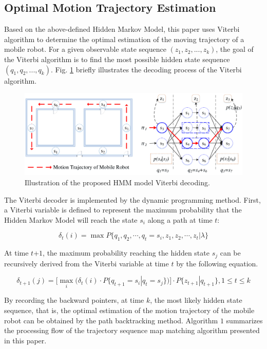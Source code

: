 \documentclass{llncs}
\begin{document}
\subsection{Optimal Motion Trajectory Estimation}

Based on the above-defined Hidden Markov Model, this paper uses Viterbi algorithm to determine the optimal estimation of the moving trajectory of a mobile robot. For a given observable state sequence $({z_1},{z_2},...,{z_k})$, the goal of the Viterbi algorithm is to find the most possible hidden state sequence $({q_1},{q_2},...,{q_k})$. Fig. \ref{fig-viterbi} briefly illustrates the decoding process of the Viterbi algorithm.

\begin{figure}[!htbp]
	\centering
	\includegraphics[width=4.976in]{RobotMatch-ViterbiDecoding}
	\caption{Illustration of the proposed HMM model Viterbi decoding.}
	\label{fig-viterbi}
\end{figure}

The Viterbi decoder is implemented by the dynamic programming method. First, a Viterbi variable is defined to represent the maximum probability that the Hidden Markov Model will reach the state $s_i$ along a path at time $t$:

\begin{equation}
	{\delta _t}(i) = \max P\{ {q_1},{q_2}, \cdots ,{q_t} = {s_i},{z_1},{z_2}, \cdots ,{z_t}|\lambda \}
\end{equation}

At time $t$+$1$, the maximum probability reaching the hidden state $s_j$ can be recursively derived from the Viterbi variable at time $t$ by the following equation. 

\begin{equation}
	{\delta _{t + 1}}(j) = [\mathop {\max }\limits_i ({\delta _t}(i) \cdot P\{ {q_{t + 1}} = {s_i}|{q_t} = {s_j}\} )] \cdot P\{ {z_{t + 1}}|{q_{t + 1}}\} ,1 \le t \le k
\end{equation}

By recording the backward pointers, at time $k$, the most likely hidden state sequence, that is, the optimal estimation of the motion trajectory of the mobile robot can be obtained by the path backtracking method. Algorithm $1$ summarizes the processing flow of the trajectory sequence map matching algorithm presented in this paper. 
\end{document}
